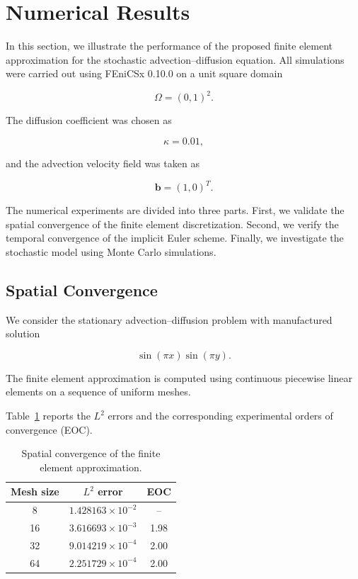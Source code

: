 \section{Numerical Results}

In this section, we illustrate the performance of the proposed finite element approximation for 
the stochastic advection--diffusion equation. All simulations were carried out using FEniCSx 
0.10.0 on a unit square domain

\[
\Omega=(0,1)^2.
\]

The diffusion coefficient was chosen as

\[
\kappa = 0.01,
\]

and the advection velocity field was taken as

\[
\mathbf b=(1,0)^T.
\]

The numerical experiments are divided into three parts. First, we validate the spatial convergence 
of the finite element discretization. Second, we verify the temporal convergence of the implicit 
Euler scheme. Finally, we investigate the stochastic model using Monte Carlo simulations.

\subsection{Spatial Convergence}

We consider the stationary advection--diffusion problem with manufactured solution

\[
\sin(\pi x)\sin(\pi y).
\]

The finite element approximation is computed using continuous piecewise linear elements on a sequence 
of uniform meshes.

Table~\ref{tab:spatial_convergence} reports the $L^2$ errors and the corresponding experimental orders of convergence (EOC).

\begin{table}[ht]
\centering
\caption{Spatial convergence of the finite element approximation.}
\label{tab:spatial_convergence}
\begin{tabular}{ccc}
\hline
Mesh size & $L^2$ error & EOC \\
\hline
8 & $1.428163\times10^{-2}$ & -- \\
16 & $3.616693\times10^{-3}$ & 1.98 \\
32 & $9.014219\times10^{-4}$ & 2.00 \\
64 & $2.251729\times10^{-4}$ & 2.00 \\
\hline
\end{tabular}
\end{table}

